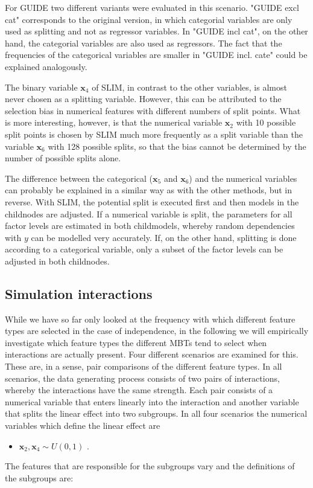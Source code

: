 For GUIDE two different variants were evaluated in this scenario. "GUIDE excl cat" corresponds to the original version, in which categorial variables are only used as splitting and not as regressor variables. In "GUIDE incl cat", on the other hand, the categorial variables are also used as regressors. The fact that the frequencies of the categorical variables are smaller in "GUIDE incl. cate" could be explained analogously.

The binary variable $\textbf{x}_4$ of SLIM, in contrast to the other variables, is almost never chosen as a splitting variable. However, this can be attributed to the selection bias in numerical features with different numbers of split points. What is more interesting, however, is that the numerical variable $\textbf{x}_2$ with 10 possible split points is chosen by SLIM much more frequently as a split variable than the variable $\textbf{x}_6$ with 128 possible splits, so that the bias cannot be determined by the number of possible splits alone.

The difference between the categorical ($\textbf{x}_5$ and $\textbf{x}_6$) and the numerical variables can probably be explained in a similar way as with the other methods, but in reverse. With SLIM, the potential split is executed first and then models in the childnodes are adjusted.  If a numerical variable is split, the parameters for all factor levels are estimated in both childmodels, whereby random dependencies with $y$ can be modelled very accurately. If, on the other hand, splitting is done according to a categorical variable, only a subset of the factor levels can be adjusted in both childnodes.





\subsection{Simulation interactions}
While we have so far only looked at the frequency with which different feature types are selected in the case of independence, in the following we will empirically investigate which feature types the different MBTs tend to select when interactions are actually present.
Four different scenarios are examined for this. These are, in a sense, pair comparisons of the different feature types. In all scenarios, the data generating process consists of two pairs of interactions, whereby the interactions have the same strength. Each pair consists of a numerical variable that enters linearly into the interaction and another variable that splits the linear effect into two subgroups.
In all four scenarios the numerical variables which define the linear effect are 
\begin{itemize}
    \item $\textbf{x}_{2}, \textbf{x}_{4} \sim U(0,1)$ .
\end{itemize}
The features that are responsible for the subgroups vary and the definitions of the subgroups are:

